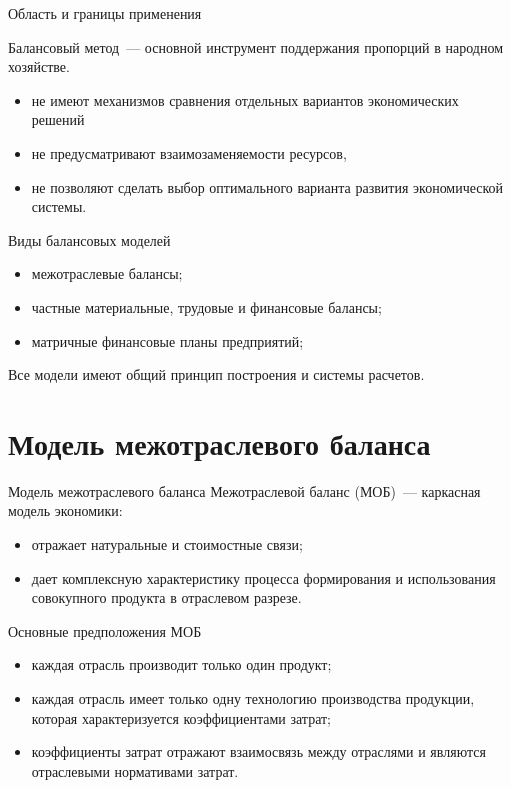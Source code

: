 \documentclass[unicode,11pt,notheorems,xcolor=table]{beamer}
\begin{document}
\begin{frame}{Область и границы применения}

	Балансовый метод~--- основной инструмент поддержания пропорций в народном хозяйстве. 

	\bigskip
		\begin{itemize}
		\item
			не имеют механизмов сравнения отдельных вариантов экономических решений 
		\item 
			не предусматривают взаимозаменяемости ресурсов, 
		\item 
			не позволяют сделать выбор оптимального варианта развития экономической системы.
	\end{itemize}
\end{frame}


\begin{frame}{Виды балансовых моделей}
\begin{itemize}
	\item межотраслевые балансы;
	\item частные материальные, трудовые и финансовые балансы;
	\item матричные финансовые планы предприятий;
\end{itemize}

\begin{block}{}
	Все модели имеют общий принцип построения и системы расчетов.
\end{block}
\end{frame}

\section{Модель межотраслевого баланса}

\begin{frame}{Модель межотраслевого баланса}
\alert{Межотраслевой баланс} (МОБ)~--- каркасная модель
экономики:
	\begin{itemize}
		\item отражает натуральные и стоимостные связи;
		\item дает комплексную характеристику процесса формирования и использования совокупного продукта в отраслевом разрезе.
	\end{itemize}
\end{frame}
\begin{frame}{Основные предположения МОБ}
	\begin{itemize}
		\item каждая отрасль производит только один продукт;
		\item каждая отрасль имеет только одну технологию производства продукции, которая характеризуется коэффициентами затрат;
		\item коэффициенты затрат отражают взаимосвязь между отраслями и являются отраслевыми нормативами затрат.
	\end{itemize}
\end{frame}
\end{document}
